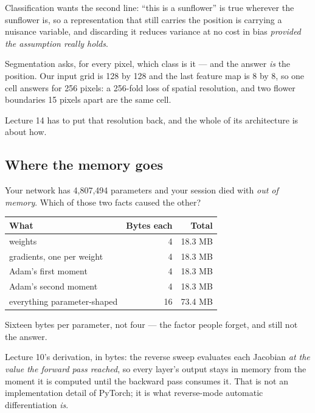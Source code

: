 \documentclass[11pt,a4paper]{article}
\begin{document}
Classification wants the second line: ``this is a sunflower'' is true wherever
the sunflower is, so a representation that still carries the position is
carrying a nuisance variable, and discarding it reduces variance at no cost in
bias \emph{provided the assumption really holds}.

\begin{failbox}[title={Failure condition --- why per-pixel prediction cannot afford it}]
Segmentation asks, for every pixel, which class is it --- and the answer
\emph{is} the position. Our input grid is 128 by 128 and the last feature map
is 8 by 8, so one cell answers for 256 pixels: a 256-fold loss of spatial
resolution, and two flower boundaries 15 pixels apart are the same cell.

Lecture 14 has to put that resolution back, and the whole of its architecture
is about how.
\end{failbox}

\subsection{Where the memory goes}

Your network has 4{,}807{,}494 parameters and your session died with
\emph{out of memory}. Which of those two facts caused the other?

\begin{center}
\small
\begin{tabular}{lrr}
\toprule
\textbf{What} & \textbf{Bytes each} & \textbf{Total} \\
\midrule
weights & 4 & 18.3 MB \\
gradients, one per weight & 4 & 18.3 MB \\
Adam's first moment & 4 & 18.3 MB \\
Adam's second moment & 4 & 18.3 MB \\
\midrule
everything parameter-shaped & 16 & 73.4 MB \\
\bottomrule
\end{tabular}
\end{center}

Sixteen bytes per parameter, not four --- the factor people forget, and still
not the answer.

Lecture 10's derivation, in bytes: the reverse sweep evaluates each Jacobian
\emph{at the value the forward pass reached}, so every layer's output stays in
memory from the moment it is computed until the backward pass consumes it. That
is not an implementation detail of PyTorch; it is what reverse-mode automatic
differentiation \emph{is}.
\end{document}
